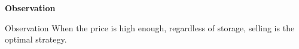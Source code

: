 \documentclass{beamer}
\begin{document}
\begin{frame}
\begin{columns}
\end{columns}

\end{frame}

\begin{frame}
{\bf Observation}

\begin{block}{Observation}
When the price is high enough, regardless of storage, selling is the optimal strategy.
\end{block}


\end{frame}
\end{document}
